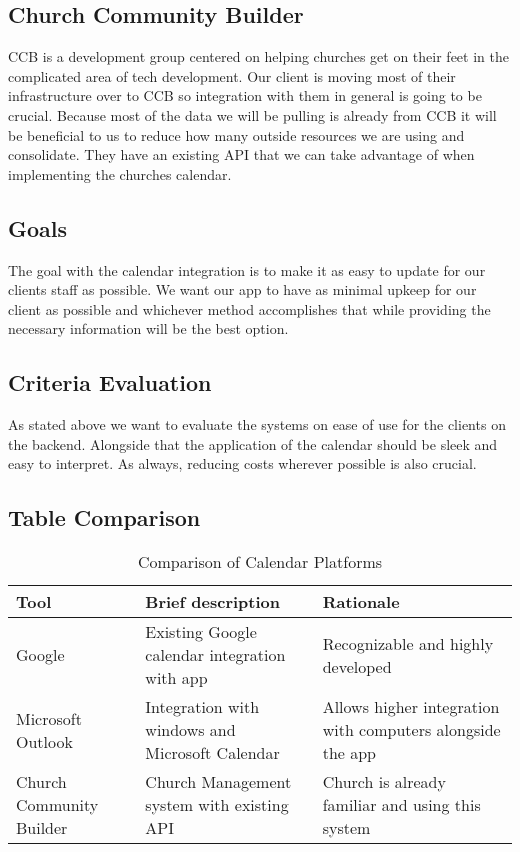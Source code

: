 \documentclass[letterpaper,10pt,draftclsnofoot,onecolumn,titlepage]{IEEEtran}
\begin{document}
	\subsection{Church Community Builder}
	CCB is a development group centered on helping churches get on their feet in the complicated area of tech development. Our client is moving most of their infrastructure over to CCB so integration with them in general is going to be crucial. Because most of the data we will be pulling is already from CCB it will be beneficial to us to reduce how many outside resources we are using and consolidate. They have an existing API that we can take advantage of when implementing the churches calendar. 
	\subsection{Goals}
	The goal with the calendar integration is to make it as easy to update for our clients staff as possible. We want our app to have as minimal upkeep for our client as possible and whichever method accomplishes that while providing the necessary information will be the best option.
	\subsection{Criteria Evaluation}
	As stated above we want to evaluate the systems on ease of use for the clients on the backend. Alongside that the application of the calendar should be sleek and easy to interpret. As always, reducing costs wherever possible is also crucial. 
	\subsection{Table Comparison}
	\begin{table}[ht]
	\caption{Comparison of Calendar Platforms}
	\begin{center}
	\begin{tabular} { | m{3cm} | m{5cm} | m{5cm} | }
	\hline\hline
	Tool & Brief description & Rationale \\ [0.5ex]
	\hline
	Google & Existing Google calendar integration with app & Recognizable and highly developed \\
	\hline
	Microsoft Outlook & Integration with windows and Microsoft Calendar & Allows higher integration with computers alongside the app \\
	\hline
	Church Community Builder & Church Management system with existing API & Church is already familiar and using this system \\
	\hline
	\end{tabular}
	\end{center}
	\end{table}
\end{document}
